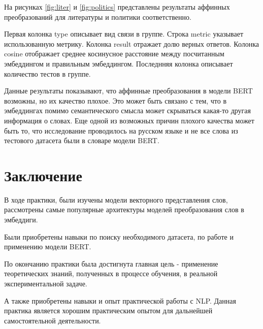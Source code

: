 \documentclass[a4paper,14pt]{article}
\begin{document}
	На рисунках \ref{fig:liter} и \ref{fig:politics} представлены результаты аффинных преобразований для литературы и политики соответственно.
	
	Первая колонка type описывает вид связи в группе.
	Строка metric указывает использованную метрику.
	Колонка result отражает долю верных ответов.
	Колонка cosine отображает среднее косинусное расстояние между посчитанным эмбеддингом и правильным эмбеддингом.
	Последнняя колонка описывает количество тестов в группе.
	
	Данные результаты показывают, что аффинные преобразования в модели BERT возможны, но их качество плохое.
	Это может быть связано с тем, что в эмбеддингах помимо семантического смысла может скрываться какая-то другая информация о словах.
	Еще одной из возможных причин плохого качества может быть то, что исследование проводилось на русском языке и не все слова из тестового датасета были в словаре модели BERT.
	
	
	\pagebreak
	\section{Заключение}
	
	В ходе практики, были изучены модели векторного представления слов, рассмотрены самые популярные архитектуры моделей преобразования слов в эмбеддиги.
	
	Были приобретены навыки по поиску необходимого датасета, по работе и применению модели BERT.
	
	По окончанию практики была достигнута главная цель - применение теоретических знаний, полученных в процессе обучения, в реальной экспериментальной задаче.
	
	А также приобретены навыки и опыт практической работы с NLP.
	Данная практика является хорошим практическим опытом для дальнейшей самостоятельной деятельности.
	
	\newpage 
	
	\renewcommand{\refname}{{ Список использованных источников}} 
	
	
	
	
	
\end{document}
